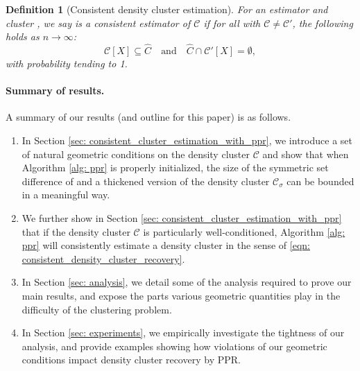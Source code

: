 \documentclass{article}
\newcommand{\1}{\mathbf{1}}
\newcommand{\Xbf}{X}             %
\newcommand{\Cbb}{\mathbb{C}}
\newcommand{\Cset}{\mathcal{C}}
\newcommand{\Csig}{\Cset_{\sigma}}
\newcommand{\Cest}{\widehat{C}}
\theoremstyle{aldenthm}
\newtheorem{definition}{Definition}
\theoremstyle{aldenrmrk}
\begin{document}

\begin{definition}[Consistent density cluster estimation]
  \label{def: consistent_density_cluster_estimation}
  For an estimator \smash{$\Cest \subseteq \Xbf$} and cluster 
  \smash{$\Cset \in \Cbb_f(\lambda)$}, we say \smash{$\Cest$} is a consistent 
  estimator of $\Cset$ if for all \smash{$\Cset' \in \Cbb_f(\lambda)$} with
  $\Cset \not= \Cset'$, the following holds as $n \to \infty$: 
  \begin{equation}
    \label{eqn: consistent_density_cluster_recovery}
    \Cset[\Xbf] \subseteq \Cest \quad \text{and} \quad
    \Cest \cap \Cset'[\Xbf] = \emptyset,
  \end{equation}
  with probability tending to 1.
\end{definition}

\paragraph{Summary of results.} A summary of our results (and outline for this
paper) is as follows.

\begin{enumerate}
\item In Section \ref{sec: consistent_cluster_estimation_with_ppr}, we introduce
  a set of natural geometric conditions on the density cluster $\Cset$
  and show that when Algorithm \ref{alg: ppr} is properly initialized, the size of
  the symmetric set difference of \smash{$\Cest$} and a thickened version of the
  density cluster $\Csig$ can be bounded in a meaningful way.
	
\item We further show in Section \ref{sec:
    consistent_cluster_estimation_with_ppr} that if the density cluster 
  $\Cset$ is particularly well-conditioned, Algorithm \ref{alg: ppr}
  will consistently estimate a density cluster in the sense of
  \eqref{eqn: consistent_density_cluster_recovery}. 
	
\item In Section \ref{sec: analysis}, we detail some of the analysis required to
  prove our main results, and expose the parts various geometric quantities play 
  in the difficulty of the clustering problem. 
	
\item In Section \ref{sec: experiments}, we empirically investigate the
  tightness of our analysis, and provide examples showing how violations of our
  geometric conditions impact density cluster recovery by PPR.
\end{enumerate}
\end{document}
